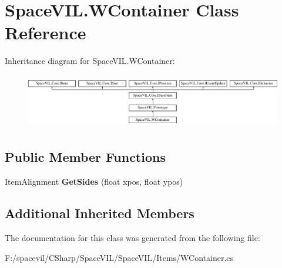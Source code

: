 \hypertarget{class_space_v_i_l_1_1_w_container}{}\section{Space\+V\+I\+L.\+W\+Container Class Reference}
\label{class_space_v_i_l_1_1_w_container}
Inheritance diagram for Space\+V\+I\+L.\+W\+Container\+:\begin{figure}[H]
\begin{center}
\leavevmode
\includegraphics[height=2.421622cm]{class_space_v_i_l_1_1_w_container}
\end{center}
\end{figure}
\subsection*{Public Member Functions}
\begin{DoxyCompactItemize}
\item 
\mbox{\label{class_space_v_i_l_1_1_w_container_ac1f0ab7e9f515147a1aa62d8bc0de897}} 
Item\+Alignment {\bfseries Get\+Sides} (float xpos, float ypos)
\end{DoxyCompactItemize}
\subsection*{Additional Inherited Members}


The documentation for this class was generated from the following file\+:\begin{DoxyCompactItemize}
\item 
F\+:/spacevil/\+C\+Sharp/\+Space\+V\+I\+L/\+Space\+V\+I\+L/\+Items/W\+Container.\+cs\end{DoxyCompactItemize}
